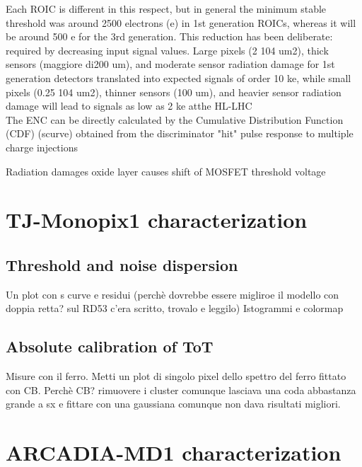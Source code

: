 Each ROIC is different in this respect, but in general the minimum stable threshold was around 2500 electrons (e) in 1st generation ROICs, whereas it will be around 500 e for the 3rd generation. This reduction has been deliberate: required by decreasing input signal values. Large pixels (2  104 um2), thick sensors (maggiore di200 um), and moderate sensor radiation damage for 1st generation detectors translated into expected signals of order 10 ke, while small pixels (0.25  104 um2), thinner sensors (100 um), and heavier sensor radiation damage will lead to signals as low as 2 ke atthe HL-LHC\\
The ENC can be directly calculated by the Cumulative Distribution Function (CDF) (scurve) obtained from the discriminator "hit" pulse response to multiple charge injections

Radiation damages oxide layer causes shift of MOSFET threshold voltage
\section{TJ-Monopix1 characterization}


    \subsection{Threshold and noise dispersion}
    Un plot con s curve e residui (perchè dovrebbe essere migliroe il modello con doppia retta? sul RD53 c'era scritto, trovalo e leggilo)
    Istogrammi e colormap\\
    
    \subsection{Absolute calibration of ToT}
    Misure con il ferro. Metti un plot di singolo pixel dello spettro del ferro fittato con CB. Perchè CB? rimuovere i cluster comunque lasciava una coda abbastanza grande a sx e fittare con una gaussiana comunque non dava risultati migliori. 
    



\section{ARCADIA-MD1 characterization}
